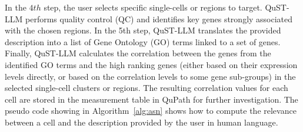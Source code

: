 \documentclass{article}
\begin{document}
In the $4th$ step, the user selects specific single-cells or regions to target. QuST-LLM performs quality control (QC) and identifies key genes strongly associated with the chosen regions. In the 5th step, QuST-LLM translates the provided description into a list of Gene Ontology (GO) terms linked to a set of genes. Finally, QuST-LLM calculates the correlation between the genes from the identified GO terms and the high ranking genes  (either based on their expression levels directly, or based on the correlation levels to some gene sub-groups) in the selected single-cell clusters or regions. The resulting correlation values for each cell are stored in the measurement table in QuPath for further investigation. The pseudo code showing in Algorithm~\ref{alg:asn} shows how to compute the relevance between a cell and the description provided by the user in human language.
\end{document}
